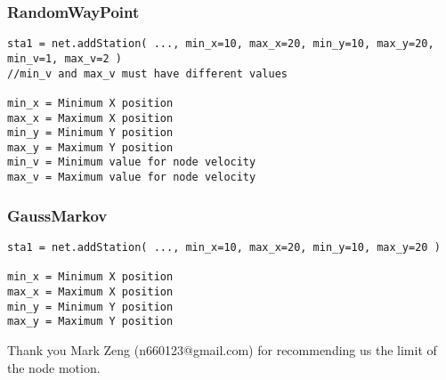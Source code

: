 \subsubsection{RandomWayPoint}

\begin{verbatim}
sta1 = net.addStation( ..., min_x=10, max_x=20, min_y=10, max_y=20, min_v=1, max_v=2 )
//min_v and max_v must have different values

min_x = Minimum X position
max_x = Maximum X position
min_y = Minimum Y position
max_y = Maximum Y position
min_v = Minimum value for node velocity
max_v = Maximum value for node velocity
\end{verbatim}

\subsubsection{GaussMarkov}

\begin{verbatim}
sta1 = net.addStation( ..., min_x=10, max_x=20, min_y=10, max_y=20 )

min_x = Minimum X position
max_x = Maximum X position
min_y = Minimum Y position
max_y = Maximum Y position

\end{verbatim}


\begin{remark}
Thank you Mark Zeng (n660123@gmail.com) for recommending us the limit of the node motion.
\end{remark}